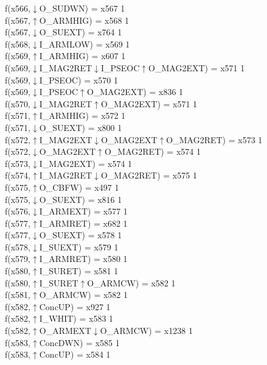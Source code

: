 f(x566,$\downarrow$O\_SUDWN) = x567 {1} \\
f(x567,$\uparrow$O\_ARMHIG) = x568 {1} \\
f(x567,$\downarrow$O\_SUEXT) = x764 {1} \\
f(x568,$\downarrow$I\_ARMLOW) = x569 {1} \\
f(x569,$\uparrow$I\_ARMHIG) = x607 {1} \\
f(x569,$\downarrow$I\_MAG2RET$\downarrow$I\_PSEOC$\uparrow$O\_MAG2EXT) = x571 {1} \\
f(x569,$\downarrow$I\_PSEOC) = x570 {1} \\
f(x569,$\downarrow$I\_PSEOC$\uparrow$O\_MAG2EXT) = x836 {1} \\
f(x570,$\downarrow$I\_MAG2RET$\uparrow$O\_MAG2EXT) = x571 {1} \\
f(x571,$\uparrow$I\_ARMHIG) = x572 {1} \\
f(x571,$\downarrow$O\_SUEXT) = x800 {1} \\
f(x572,$\uparrow$I\_MAG2EXT$\downarrow$O\_MAG2EXT$\uparrow$O\_MAG2RET) = x573 {1} \\
f(x572,$\downarrow$O\_MAG2EXT$\uparrow$O\_MAG2RET) = x574 {1} \\
f(x573,$\downarrow$I\_MAG2EXT) = x574 {1} \\
f(x574,$\uparrow$I\_MAG2RET$\downarrow$O\_MAG2RET) = x575 {1} \\
f(x575,$\uparrow$O\_CBFW) = x497 {1} \\
f(x575,$\downarrow$O\_SUEXT) = x816 {1} \\
f(x576,$\downarrow$I\_ARMEXT) = x577 {1} \\
f(x577,$\uparrow$I\_ARMRET) = x682 {1} \\
f(x577,$\downarrow$O\_SUEXT) = x578 {1} \\
f(x578,$\downarrow$I\_SUEXT) = x579 {1} \\
f(x579,$\uparrow$I\_ARMRET) = x580 {1} \\
f(x580,$\uparrow$I\_SURET) = x581 {1} \\
f(x580,$\uparrow$I\_SURET$\uparrow$O\_ARMCW) = x582 {1} \\
f(x581,$\uparrow$O\_ARMCW) = x582 {1} \\
f(x582,$\uparrow$ConcUP) = x927 {1} \\
f(x582,$\uparrow$I\_WHIT) = x583 {1} \\
f(x582,$\uparrow$O\_ARMEXT$\downarrow$O\_ARMCW) = x1238 {1} \\
f(x583,$\uparrow$ConcDWN) = x585 {1} \\
f(x583,$\uparrow$ConcUP) = x584 {1} \\
